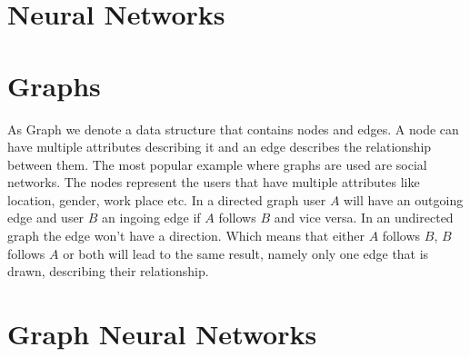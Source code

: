 
	\section{Neural Networks}


	\section{Graphs}

		\justifying \noindent
		As Graph we denote a data structure that contains nodes and edges. A node can have multiple attributes describing it and an edge describes the relationship between them. The most popular example where graphs are used are social networks. The nodes represent the users that have multiple attributes like location, gender, work place etc. In a directed graph user $A$ will have an outgoing edge and user $B$ an ingoing edge if $A$ follows $B$ and vice versa. In an undirected graph the edge won't have a direction. Which means that either $A$ follows $B$, $B$ follows $A$ or both will lead to the same result, namely only one edge that is drawn, describing their relationship.

	\section{Graph Neural Networks}
